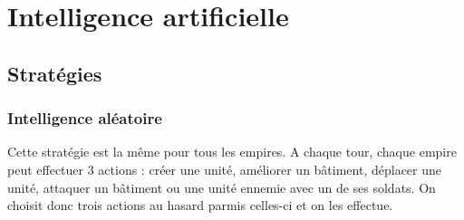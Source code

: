 \documentclass[12pt,a4paper]{article}
\begin{document}
\section{Intelligence artificielle}

\subsection{Stratégies}
\subsubsection{Intelligence aléatoire}
Cette stratégie est la même pour tous les empires. A chaque tour, chaque empire peut effectuer 3 actions : créer une unité, améliorer un bâtiment, déplacer une unité, attaquer un bâtiment ou une unité ennemie avec un de ses soldats. On choisit donc trois actions au hasard parmis celles-ci et on les effectue. 
\end{document}
